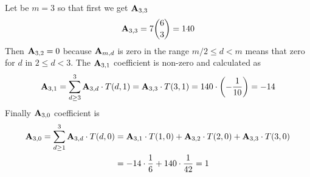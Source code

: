 \begin{examp}
    Let be $m=3$ so that first we get ${\mathbf{A}} \sb{3,3}$
    \begin{equation*}
        {\mathbf{A}} \sb{3,3} = 7 \binom{6}{3}= 140
    \end{equation*}
    Then ${\mathbf{A}} \sb{3,2} = 0$ because ${\mathbf{A}} \sb{m,d}$ is zero in the range $m/2 \leq d < m$ means that zero for $d$ in
    $2 \leq d < 3$.
    The ${\mathbf{A}} \sb{3,1}$ coefficient is non-zero and calculated as
    \begin{equation*}
        \begin{split}
            {\mathbf{A}} \sb{3,1} = \sum_{d \geq 3}^{3} {\mathbf{A}} \sb{3,d} \cdot T(d,1) = {\mathbf{A}} \sb{3,3} \cdot T(3,1)
            = 140 \cdot \left( -\frac{1}{10} \right) = -14
        \end{split}
    \end{equation*}
    Finally ${\mathbf{A}} \sb{3,0}$ coefficient is
    \begin{equation*}
        \begin{split}
            {\mathbf{A}} \sb{3,0}= \sum_{d \geq 1}^{3} {\mathbf{A}} \sb{3,d} \cdot T(d,0)
            &= {\mathbf{A}} \sb{3,1} \cdot T(1,0) + {\mathbf{A}} \sb{3,2} \cdot T(2,0) + {\mathbf{A}} \sb{3,3} \cdot T(3,0) \\
            &= -14 \cdot \frac{1}{6} + 140 \cdot \frac{1}{42} = 1
        \end{split}
    \end{equation*}
\end{examp}